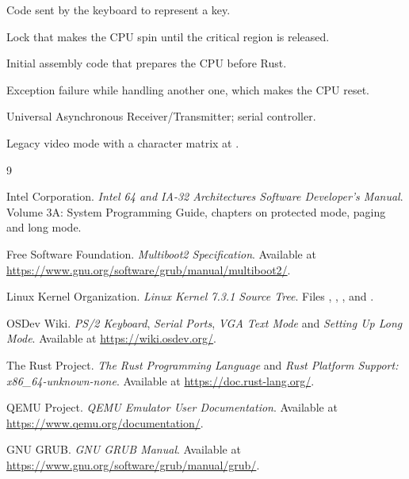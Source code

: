 \begin{description}[style=nextline,leftmargin=2em]
  \item[Scancode] Code sent by the keyboard to represent a key.
  \item[Spinlock] Lock that makes the CPU spin until the critical region is
        released.
  \item[Stub] Initial assembly code that prepares the CPU before Rust.
  \item[Triple fault] Exception failure while handling another one,
        which makes the CPU reset.
  \item[UART] Universal Asynchronous Receiver/Transmitter; serial
        controller.
  \item[VGA text] Legacy video mode with a character matrix at
        .
\end{description}

\begin{thebibliography}{9}

Intel Corporation.
\newblock \emph{Intel 64 and IA-32 Architectures Software Developer's
Manual}.
\newblock Volume 3A: System Programming Guide, chapters on protected
mode, paging and long mode.

Free Software Foundation.
\newblock \emph{Multiboot2 Specification}.
\newblock Available at \url{https://www.gnu.org/software/grub/manual/multiboot2/}.

Linux Kernel Organization.
\newblock \emph{Linux Kernel 7.3.1 Source Tree}.
\newblock Files , ,
,  and .

OSDev Wiki.
\newblock \emph{PS/2 Keyboard}, \emph{Serial Ports}, \emph{VGA Text Mode} and
\emph{Setting Up Long Mode}.
\newblock Available at \url{https://wiki.osdev.org/}.

The Rust Project.
\newblock \emph{The Rust Programming Language} and \emph{Rust Platform Support:
x86\_64-unknown-none}.
\newblock Available at \url{https://doc.rust-lang.org/}.

QEMU Project.
\newblock \emph{QEMU Emulator User Documentation}.
\newblock Available at \url{https://www.qemu.org/documentation/}.

GNU GRUB.
\newblock \emph{GNU GRUB Manual}.
\newblock Available at \url{https://www.gnu.org/software/grub/manual/grub/}.

\end{thebibliography}
